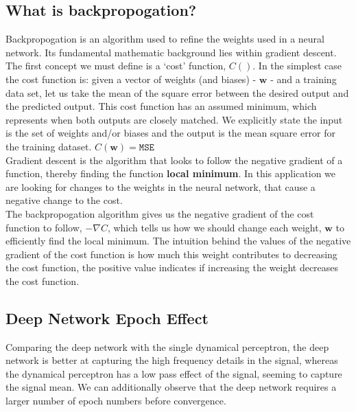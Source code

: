 \documentclass[12pt]{article}
\def\vw{{\bm{w}}}
\begin{document}
	\subsection{What is backpropogation?} \label{sec: 4-6-backpropogation}
		Backpropogation is an algorithm used to refine the weights used in a neural network. Its fundamental mathematic background lies within gradient descent.\\
		The first concept we must define is a `cost' function, ${C}()$. In the simplest case the cost function is: given a vector of weights (and biases) - $\vw$ - and a training data set, let us take the mean of the square error between the desired output and the predicted output. This cost function has an assumed minimum, which represents when both outputs are closely matched. We explicitly state the input is the set of weights and/or biases and the output is the mean square error for the training dataset. ${C}(\vw)=\texttt{MSE}$\\
		Gradient descent is the algorithm that looks to follow the negative gradient of a function, thereby finding the function \textbf{local minimum}. In this application we are looking for changes to the weights in the neural network, that cause a negative change to the cost. \\
		The backpropogation algorithm gives us the negative gradient of the cost function to follow, $-\nabla{C}$, which tells us how we should change each weight, $\vw$ to efficiently find the local minimum. The intuition behind the values of the negative gradient of the cost function is how much this weight contributes to decreasing the cost function, the positive value indicates if increasing the weight decreases the cost function.
		
	\subsection{Deep Network Epoch Effect} \label{sec: 4-7-DL-epoch}
		Comparing the deep network with the single dynamical perceptron, the deep network is better at capturing the high frequency details in the signal, whereas the dynamical perceptron has a low pass effect of the signal, seeming to capture the signal mean. We can additionally observe that the deep network requires a larger number of epoch numbers before convergence.
		
\end{document}
